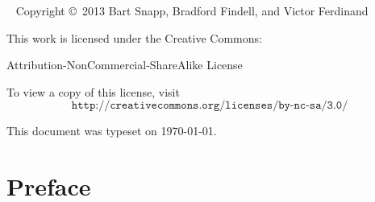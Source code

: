 

\newpage

\begin{fullwidth}
~\vfill
\thispagestyle{empty}
\setlength{\parindent}{0pt}
\setlength{\parskip}{\baselineskip}
Copyright \copyright~2013 Bart Snapp, Bradford Findell, and Victor Ferdinand

\vspace{.5cm}

\noindent
This work is licensed under the Creative Commons:
\begin{center}
Attribution-NonCommercial-ShareAlike License 
\end{center}
To view a copy of this license, visit
\[
\texttt{http://creativecommons.org/licenses/by-nc-sa/3.0/}
\]


\vspace{.5cm}
\noindent This document was typeset on \today.
\end{fullwidth}



\chapter*{Preface}



